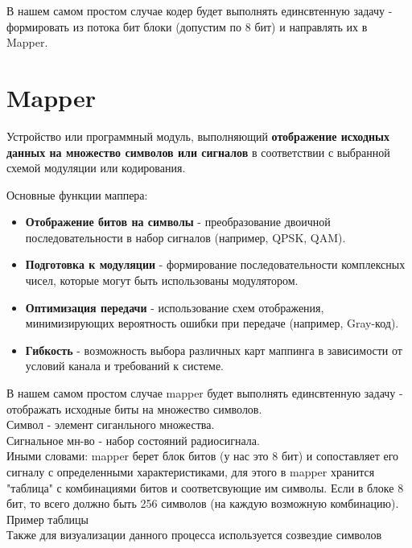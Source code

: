 В нашем самом простом случае кодер будет выполнять единсвтенную задачу - формировать из потока бит блоки (допустим по 8 бит) и
направлять их в Mapper.

\section*{Mapper}

Устройство или программный модуль, выполняющий \textbf{отображение исходных данных на множество символов или сигналов} в соответствии с выбранной схемой модуляции или кодирования. 

\medskip

Основные функции маппера:
\begin{itemize}
    \item \textbf{Отображение битов на символы} - преобразование двоичной последовательности в набор сигналов (например, QPSK, QAM).
    \item \textbf{Подготовка к модуляции} - формирование последовательности комплексных чисел, которые могут быть использованы модулятором.
    \item \textbf{Оптимизация передачи} - использование схем отображения, минимизирующих вероятность ошибки при передаче (например, Gray-код).
    \item \textbf{Гибкость} - возможность выбора различных карт маппинга в зависимости от условий канала и требований к системе.
\end{itemize}

В нашем самом простом случае mapper будет выполнять единсвтенную задачу - отображать исходные биты на множество символов. \\

Символ - элемент сиганльного множества. \\

Сигнальное мн-во - набор состояний радиосигнала. \\

Иными словами: mapper берет блок битов (у нас это 8 бит) и сопоставляет его сигналу с определенными характеристиками, для 
этого в mapper хранится "таблица" с комбинациями битов и соответсвующие им символы. Если в блоке
8 бит, то всего должно быть 256 символов (на каждую возможную комбинацию). \\

Пример таблицы \\

Также для визуализации данного процесса используется созвездие символов \\

